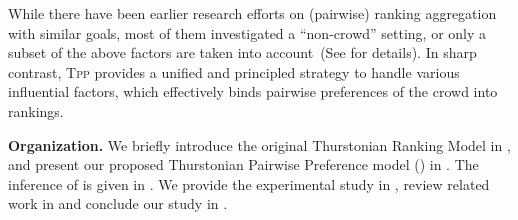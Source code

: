 While there have been earlier research efforts on (pairwise) ranking aggregation
with similar goals, most of them investigated a ``non-crowd'' setting, or only a
subset of the above factors are taken into account~(See
 for details). In sharp contrast, \textsc{Tpp}
provides a unified and principled strategy to handle various influential
factors, which  effectively binds pairwise preferences of the crowd into
rankings.

\noindent \textbf{Organization.} We briefly introduce the original Thurstonian
Ranking Model in , and present our proposed Thurstonian
Pairwise Preference model (\tpp{}) in . The inference of
\tpp{} is given in . We provide the experimental study in
, review related work in  and
conclude our study in .
